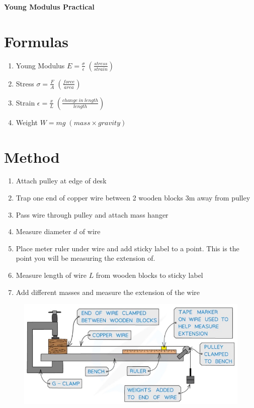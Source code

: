 \documentclass[12pt]{article}
\begin{document}
    {\Huge \textbf{Young Modulus Practical} \par}
    
    \section*{Formulas}
    \begin{enumerate}
        \item Young Modulus $E = \frac{\sigma}{\epsilon} \; \left(\frac{stress}{strain}\right)$
        \item Stress $\sigma = \frac{F}{A} \; \left(\frac{force}{area}\right)$
        \item Strain $\epsilon = \frac{x}{L} \; \left(\frac{change \: in \: length}{length}\right)$
        \item Weight $W = mg \; \left(mass \times gravity\right)$
    \end{enumerate}

    \section*{Method}
    \begin{enumerate}
        \item Attach pulley at edge of desk
        \item Trap one end of copper wire between 2 wooden blocks 3m away from pulley
        \item Pass wire through pulley and attach mass hanger
        \item Measure diameter $d$ of wire
        \item Place meter ruler under wire and add sticky label to a point. This is the point
        you will be measuring the extension of.
        \item Measure length of wire $L$ from wooden blocks to sticky label
        \item Add different masses and measure the extension of the wire
    \end{enumerate}

    \newpage

    \begin{figure}[h]
        \includegraphics[width = \linewidth]{YoungModul.jpg}
    \end{figure}
\end{document}
